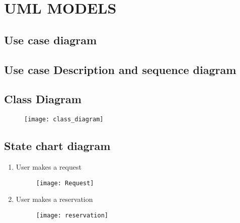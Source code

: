 
\section{UML MODELS}
\subsection{Use case diagram}
\subsection{Use case Description and sequence diagram}
\subsection{Class Diagram}
\begin{figure}[h]
	\centering
	\texttt{[image: class\_diagram]}
\end{figure}
\newpage
\subsection{State chart diagram}
\begin{enumerate}
	\item User makes a request
	\begin{figure}[h]
		\centering
		\texttt{[image: Request]}
	\end{figure}

	\item User makes a reservation
	\begin{figure}[h]
		\centering
		\texttt{[image: reservation]}
	\end{figure}
\end{enumerate}